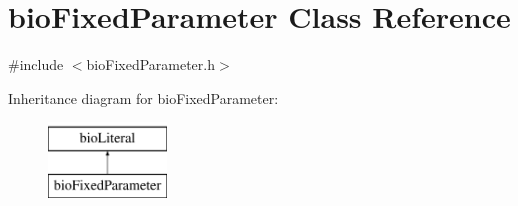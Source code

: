 \hypertarget{classbio_fixed_parameter}{}\section{bio\+Fixed\+Parameter Class Reference}
\label{classbio_fixed_parameter}


{\ttfamily \#include $<$bio\+Fixed\+Parameter.\+h$>$}

Inheritance diagram for bio\+Fixed\+Parameter\+:\begin{figure}[H]
\begin{center}
\leavevmode
\includegraphics[height=2.000000cm]{classbio_fixed_parameter}
\end{center}
\end{figure}
